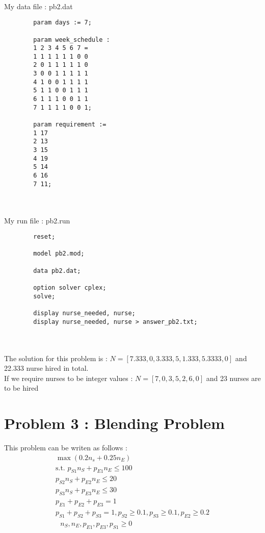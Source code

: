 \documentclass{article}
\newenvironment{DDbox}[1]{
\begin{lrbox}{\BBbox}
    \begin{minipage}{\linewidth}}
{\end{minipage}
\end{lrbox}\noindent\colorbox{Zgris}{\usebox{\BBbox}} \\
[.5cm]}
\begin{document}
\\
\newpage
My data file : pb2.dat
\\
\begin{DDbox}{\linewidth}
    \begin{verbatim}
        param days := 7;

        param week_schedule : 
        1 2 3 4 5 6 7 =
        1 1 1 1 1 1 0 0
        2 0 1 1 1 1 1 0
        3 0 0 1 1 1 1 1
        4 1 0 0 1 1 1 1
        5 1 1 0 0 1 1 1
        6 1 1 1 0 0 1 1
        7 1 1 1 1 0 0 1;

        param requirement :=
        1 17
        2 13
        3 15
        4 19
        5 14
        6 16
        7 11;
    \end{verbatim}
\end{DDbox}
\\
My run file : pb2.run
\\
\begin{DDbox}{\linewidth}
    \begin{verbatim}
        reset;

        model pb2.mod;

        data pb2.dat;

        option solver cplex;
        solve;

        display nurse_needed, nurse;
        display nurse_needed, nurse > answer_pb2.txt;
    \end{verbatim}
\end{DDbox}
\\
The solution for this problem is : $N=[7.333, 0, 3.333, 5, 1.333, 5.3333, 0]$ and 22.333 nurse hired in total.\\
If we require nurses to be integer values : $N=[7,0,3,5,2,6,0]$ and 23 nurses are to be hired
\section*{Problem 3 : Blending Problem}
This problem can be writen as follows : \begin{equation}
    \begin{array}{c}
        \max(0.2n_s+0.25n_E)\\
        \text{s.t. }p_{S1}n_S+p_{E1}n_E\leq 100\\
        p_{S2}n_S+p_{E2}n_E\leq 20 \\
        p_{S3}n_S+p_{E3}n_E\leq 30\\
        p_{E1}+p_{E2}+p_{E3} = 1\\
        p_{S1}+p_{S2}+p_{S3} = 1, p_{S2}\ge 0.1, p_{S3}\ge 0.1, p_{E2}\ge 0.2\\
        \text{     }n_S,n_E,p_{E1}, p_{E3},p_{S1}\ge0 \\
    \end{array}
\end{equation} 
\end{document}
